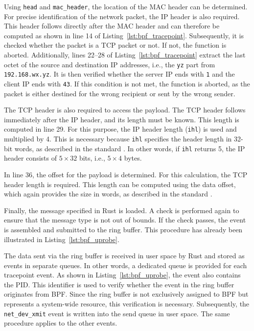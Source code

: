 Using \texttt{head} and \texttt{mac\_header}, the location of the MAC header can be determined.  
For precise identification of the network packet, the IP header is also required.  
This header follows directly after the MAC header and can therefore be computed as shown in line 14 of Listing~\ref{lst:bpf_tracepoint}.  
Subsequently, it is checked whether the packet is a \ac{TCP} packet or not.
If not, the function is aborted.  
Additionally, lines 22–28 of Listing~\ref{lst:bpf_tracepoint} extract the last octet of the source and destination IP addresses, i.e., the \texttt{yz} part from \texttt{192.168.wx.yz}.  
It is then verified whether the server IP ends with \texttt{1} and the client IP ends with \texttt{43}.  
If this condition is not met, the function is aborted, as the packet is either destined for the wrong recipient or sent by the wrong sender.  

The \ac{TCP} header is also required to access the payload.  
The TCP header follows immediately after the IP header, and its length must be known.  
This length is computed in line 29.  
For this purpose, the IP header length (\texttt{ihl}) is used and multiplied by 4.  
This is necessary because \texttt{ihl} specifies the header length in 32-bit words, as described in the standard \cite[p.~11]{rfc791}.  
In other words, if \texttt{ihl} returns 5, the IP header consists of $5 \times 32$ bits, i.e., $5 \times 4$ bytes.  

In line 36, the offset for the payload is determined.  
For this calculation, the TCP header length is required.  
This length can be computed using the data offset, which again provides the size in words, as described in the standard \cite[p.~16]{rfc793}.  

Finally, the message specified in Rust is loaded.  
A check is performed again to ensure that the message type is not out of bounds.  
If the check passes, the event is assembled and submitted to the ring buffer.  
This procedure has already been illustrated in Listing~\ref{lst:bpf_uprobe}.  

The data sent via the ring buffer is received in user space by Rust and stored as events in separate queues.  
In other words, a dedicated queue is provided for each tracepoint event.  
As shown in Listing~\ref{lst:bpf_uprobe}, the event also contains the \ac{PID}.  
This identifier is used to verify whether the event in the ring buffer originates from \ac{BPF}.  
Since the ring buffer is not exclusively assigned to \ac{BPF} but represents a system-wide resource, this verification is necessary.  
Subsequently, the \texttt{net\_dev\_xmit} event is written into the send queue in user space.  
The same procedure applies to the other events.  

